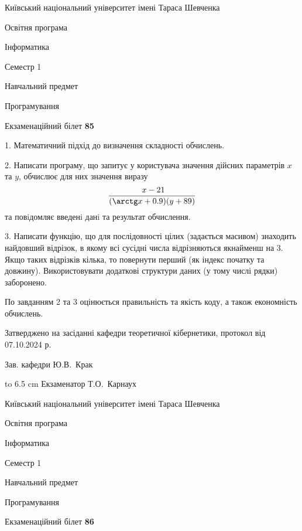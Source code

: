 \documentclass[12pt, ukrainian]{article}
\begin{document}
\newpage
{{\begin {scriptsize}\par
{ \center  Київський національний університет імені Тараса Шевченка \par}
{\parbox {5 cm}{Освітня програма \hfill}{\parbox {7 cm}{Інформатика\hfill}}\parbox {6 cm}{\hfill Семестр 1}}\par
{\parbox {5 cm} {Навчальний предмет \hfill}\parbox {7 cm}{Програмування \hfill}\parbox {6cm}{\hfill}\par}\vspace{-15pt} \end{scriptsize}}{\center Екзаменаційний білет \No \textbf { 85 }\par}}
{%
1. Математичний підхід до визначення складності обчислень.%
\par
2. Написати програму, що запитує у користувача значення дійсних параметрів $x$ та $y$, обчислює для них значення виразу 
$$\frac{\ x - 21}{(\arctg x + 0.9) (y + 89)}$$ 
та повiдомляє введенi данi та результат обчислення.

\par
3. Написати функцію, що для послідовності цілих (задається масивом) знаходить найдовший відрізок, в якому всі сусідні числа відрізняються якнайменш на 3. Якщо таких відрізків кілька, то повернути перший (як індекс початку та довжину). Використовувати додаткові структури даних (у тому числі рядки) заборонено.

По завданням 2 та 3 оцінюється правильність та якість коду, а також економність обчислень.

}
{\smallskip\smallskip \begin {scriptsize} Затверджено на засіданні кафедри теоретичної кібернетики, протокол   від   07.10.2024 р.\par\smallskip\smallskip\smallskip\smallskip
{\parbox {6.5 cm} {Зав. кафедри \dotfill Ю.В.~Крак}}\hspace {0.7cm} {\hbox to 6.5 cm { Екзаменатор \dotfill Т.О.~Карнаух}} \end{scriptsize}}
\vspace{0.9cm}
{{\begin {scriptsize}\par
{ \center  Київський національний університет імені Тараса Шевченка \par}
{\parbox {5 cm}{Освітня програма \hfill}{\parbox {7 cm}{Інформатика\hfill}}\parbox {6 cm}{\hfill Семестр 1}}\par
{\parbox {5 cm} {Навчальний предмет \hfill}\parbox {7 cm}{Програмування \hfill}\parbox {6cm}{\hfill}\par}\vspace{-15pt} \end{scriptsize}}{\center Екзаменаційний білет \No \textbf { 86 }\par}}
\end{document}
